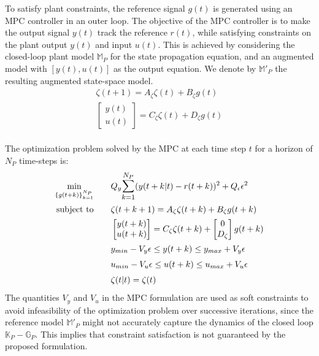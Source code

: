 \documentclass[letterpaper, 10 pt, conference]{ieeeconf}  %
\begin{document}
	To satisfy plant constraints, the reference signal $g(t)$ is generated using an MPC controller in an outer loop. The objective of the MPC controller is to make the output signal $y(t)$ track the reference $r(t)$, while satisfying constraints on the plant output $y(t)$ and input $u(t)$. This is achieved by considering the closed-loop plant model $\mathbb{M}_P$ for the state propagation equation, and an augmented model with $[y(t),u(t)]$ as the output equation. We denote by $\mathbb{M}'_P$ the resulting augmented state-space model.
	\begin{equation*}
	\begin{matrix}
	\zeta(t+1) = A_\zeta\zeta(t) + B_\zeta g(t)\\
	\begin{bmatrix}y(t)\\u(t)\end{bmatrix} = C_\zeta\zeta(t) + D_\zeta g(t)
	\end{matrix}
	\end{equation*}
	\\
	The optimization problem solved by the MPC at each time step $t$ for a horizon of $N_P$ time-steps is:
	\begin{equation}
	\begin{aligned}
	 \underset{\{g(t+k)\}_{k=1}^{N_P}}{\text{min}}
	& \hspace{20pt} Q_y\mathlarger{\sum\limits_{k=1}^{N_P}}(y(t+k|t)-r(t+k))^2 + Q_{\epsilon}\epsilon^2 \\
	 \text{subject to}
	&   \hspace{20pt}
	\zeta(t+k+1) = A_\zeta\zeta(t+k) + B_\zeta g(t+k)\\
	& \hspace{20pt} \begin{bmatrix}y(t+k)\\u(t+k)\end{bmatrix} = C_\zeta\zeta(t+k) +  \begin{bmatrix}0\\D_\zeta\end{bmatrix}g(t+k)\\
	& \hspace{20pt}  y_{min}-V_y\epsilon \leq y(t+k) \leq  y_{max}+V_y\epsilon \\
	& \hspace{20pt}  u_{min}-V_u\epsilon \leq u(t+k) \leq u_{max}+V_u\epsilon \\
	& \hspace{20pt}  \zeta(t|t) = \zeta(t)
	\end{aligned}
	\label{MPC}
	\end{equation}
	The quantities $V_y$ and $V_u$ in the MPC formulation are used as soft constraints to avoid infeasibility of the optimization problem over successive iterations, since the reference model $\mathbb{M}'_P$ might not accurately capture the dynamics of the closed loop $\mathbb{K}_P-\mathbb{G}_P$. This implies that constraint satisfaction is not guaranteed by the proposed formulation. 
	
\end{document}
